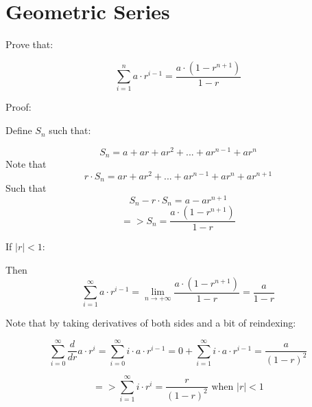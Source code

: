 \documentclass[a4paper]{article}
\author{Emil Kerimov}
\numberwithin{equation}{subsection}
\begin{document}
\section{Geometric Series}\label{Geometric Series}

Prove that:

$$\sum\limits_{i=1}^{n} a\cdot r^{i-1} =  \frac{a\cdot(1-r^{n+1})}{1-r}$$

Proof:

Define $S_n$ such that:

$$S_{n} = a + ar + ar^2 + ... + ar^{n-1}+ar^n$$
Note that $$r\cdot S_{n} = ar + ar^2 + ... + ar^{n-1} + ar^n + ar^{n+1}$$
Such that $$S_{n}-r\cdot S_{n} = a-ar^{n+1}$$
$$=>
S_{n} = \frac{a\cdot(1-r^{n+1})}{1-r}
$$


If $|r|<1$:

Then 
$$\sum\limits_{i=1}^{\infty} a\cdot r^{i-1}
= \lim_{n \to +\infty}\frac{a\cdot(1-r^{n+1})}{1-r}
= \frac{a}{1-r}
$$

Note that by taking derivatives of both sides and a bit of reindexing:

$$\sum\limits_{i=0}^{\infty} \frac{d}{dr}a\cdot r^{i}
=\sum\limits_{i=0}^{\infty} i\cdot a\cdot r^{i-1}
=0+\sum\limits_{i=1}^{\infty} i\cdot a\cdot r^{i-1}
= \frac{a}{(1-r)^2}
$$

$$=>
\sum\limits_{i=1}^{\infty} i\cdot r^{i}
= \frac{r}{(1-r)^2} \mbox{ when } |r|<1
$$
\end{document}
